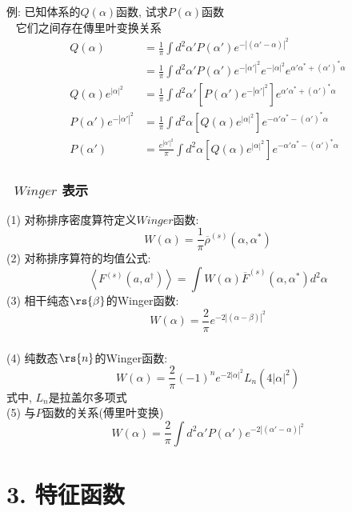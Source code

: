  \begin{frame} 
  \frametitle{}
      例: 已知体系的$Q(\alpha)$函数, 试求$P(\alpha)$函数 \\ 
      \解~ 它们之间存在傳里叶变换关系 
      \[ \begin{aligned}
        Q(\alpha) &= \frac{1}{\pi} \int  d^2 \alpha' P(\alpha') e^{-\left|(\alpha'-\alpha)\right|^2}\\
        &= \frac{1}{\pi} \int  d^2 \alpha' P(\alpha') e^{-\left|\alpha'\right|^2} e^{-\left|\alpha\right|^2} e^{\alpha'\alpha^*  +(\alpha')^* \alpha  } \\ 
        Q(\alpha)e^{\left|\alpha\right|^2} &= \frac{1}{\pi} \int  d^2 \alpha' [P(\alpha') e^{-\left|\alpha'\right|^2}]  e^{\alpha'\alpha^*  +(\alpha')^* \alpha  } \\ 
        P(\alpha') e^{-\left|\alpha'\right|^2} &= \frac{1}{\pi} \int  d^2 \alpha [Q(\alpha)e^{\left|\alpha\right|^2}]  e^{-\alpha'\alpha^*  -(\alpha')^* \alpha  } \\
        P(\alpha')  &= \frac{e^{\left|\alpha'\right|^2}}{\pi} \int  d^2 \alpha [Q(\alpha)e^{\left|\alpha\right|^2}]  e^{-\alpha'\alpha^*  -(\alpha')^* \alpha  } 
      \end{aligned}\] 
  \end{frame}

  \begin{frame} 
    \frametitle{~$Winger$ 表示}
    (1) 对称排序密度算符定义$Winger$函数:
    \[ W(\alpha) =\frac{1}{\pi} \overline{\rho}^{(s)}(\alpha, \alpha^*)\]
    (2) 对称排序算符的均值公式:
    \[ \left\langle F^{(s)} (a, a^{\dagger}) \right\rangle = \int W(\alpha) \overline{F}^{(s)} (\alpha, \alpha^{*}) d^2 \alpha\]
    (3) 相干纯态$\rs{\beta}$的Winger函数:
    \[ W(\alpha) = \frac{2}{\pi} e^{-2\left| (\alpha-\beta) \right|^2}\]
  \end{frame}

  \begin{frame} 
  \frametitle{}
    (4) 纯数态$\rs{n}$的Winger函数:
    \[ W(\alpha) = \frac{2}{\pi} (-1)^n e^{-2\left| \alpha\right|^2} L_n(4\left|\alpha\right|^2)\]
    式中, $L_n$是拉盖尔多项式 \\ {\vspace*{0.3em}}
    (5) 与$P$函数的关系(傅里叶变换)
    \[W(\alpha) = \frac{2}{\pi} \int  d^2 \alpha' P(\alpha') e^{-2\left|(\alpha'-\alpha)\right|^2}\]
  \end{frame}

  \section{3. 特征函数}

